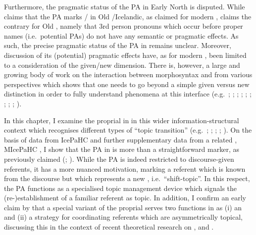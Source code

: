 \documentclass[output=paper,colorlinks,citecolor=brown]{langscibook}
\begin{document}
Furthermore, the pragmatic status of the PA in Early North  is disputed. While \citet{Johnsen2016} claims that the PA marks / in Old /Icelandic, as claimed for modern  \citep{Sigurdsson2006}, \citet{Kinn2016-thesis} claims the contrary for Old , namely that 3rd person pronouns which occur before proper names (i.e.~potential PAs) do not have any semantic or pragmatic effects.
As such, the precise pragmatic status of the PA in  remains unclear. Moreover, discussion of its (potential) pragmatic effects have, as for modern , been limited to a consideration of the given/new dimension. 
There is, however, a large and growing body of work on the interaction between morphosyntax and  from various perspectives which shows that one needs to go beyond a simple given versus new distinction in order to fully understand phenomena at this interface (e.g.~\citealp{ariel1990accessing,ariel2001accessibility}; \citealp{vallduvi92}; \citealp{groszetal95}; \citealp{vallduvi1996linguistic}; \citealp{walker1998centering}; \citealp{erteschik-shir_information_2007}; \citealp{frascarelli2007types}; \citealp{krifka07}; \citealp{bianchi2010topic}; \citealp{cook2013identifying}).\largerpage

In this chapter, I examine the proprial  in  in this wider information-structural context which recognises different types of ``topic transition'' (e.g.~\citealp{danes1974functional}; \citealp{groszetal95}; \citealp{walker1998centering}; \citealp{frascarelli2007types}; \citealp{bianchi2010topic}). On the basis of   data from IcePaHC \citep{IcePaHC}
and further supplementary data from a related , MIcePaHC \citep{MIcePaHC}, I show that the PA in  is more than a straightforward  marker, as previously claimed (\citealt{Sigurdsson2006}; \citealt{Johnsen2016}). While the PA is indeed restricted to discourse-given referents, it has a more nuanced motivation, marking a referent which is known from the discourse but which represents a new  \citep{reinhart1981pragmatics}, i.e.~``shift-topic''. In this respect, the  PA functions as a specialised topic management device which signals the (re-)establishment of a familiar referent as topic.
In addition, I confirm an early claim by \citet{heusler1962altislandisches} that a special variant of the proprial  serves two functions in  as (i) an  and (ii) a strategy for coordinating referents which are asymmetrically topical, discussing this in the context of recent theoretical research on ,  and .
\end{document}
